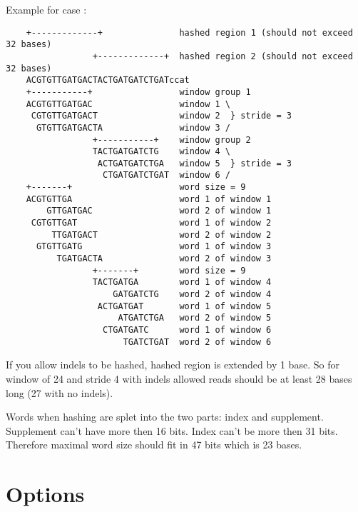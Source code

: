 \documentclass[english]{article}
\begin{document}
    Example for case    :
    
	\begin{verbatim}
    +-------------+               hashed region 1 (should not exceed 32 bases)
                 +-------------+  hashed region 2 (should not exceed 32 bases)
    ACGTGTTGATGACTACTGATGATCTGATccat
    +-----------+                 window group 1
    ACGTGTTGATGAC                 window 1 \
     CGTGTTGATGACT                window 2  } stride = 3
      GTGTTGATGACTA               window 3 /
                 +-----------+    window group 2
                 TACTGATGATCTG    window 4 \
                  ACTGATGATCTGA   window 5  } stride = 3
                   CTGATGATCTGAT  window 6 /
    +-------+                     word size = 9
    ACGTGTTGA                     word 1 of window 1
        GTTGATGAC                 word 2 of window 1
     CGTGTTGAT                    word 1 of window 2
         TTGATGACT                word 2 of window 2
      GTGTTGATG                   word 1 of window 3
          TGATGACTA               word 2 of window 3
                 +-------+        word size = 9
                 TACTGATGA        word 1 of window 4
                     GATGATCTG    word 2 of window 4
                  ACTGATGAT       word 1 of window 5
                      ATGATCTGA   word 2 of window 5
                   CTGATGATC      word 1 of window 6
                       TGATCTGAT  word 2 of window 6
   \end{verbatim}

    If you allow indels to be hashed, hashed region is extended by 1 base. So 
    for window of 24 and stride 4 with indels allowed reads should be at least
    28 bases long (27 with no indels).

    Words when hashing are splet into the two parts: index and supplement. 
    Supplement can't have more then 16 bits. Index can't be more then 31 bits.
    Therefore maximal word size should fit in 47 bits which is 23 bases.


\section{Options}\label{secOptions}
\end{document}
